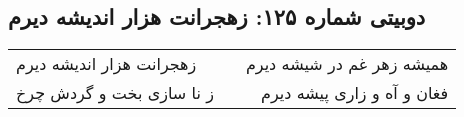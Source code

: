 \begin{center}
\section*{دوبیتی شماره ۱۲۵: زهجرانت هزار اندیشه دیرم}
\label{sec:125}
\begin{longtable}{l p{0.5cm} r}
زهجرانت هزار اندیشه دیرم
&&
همیشه زهر غم در شیشه دیرم
\\
ز نا سازی بخت و گردش چرخ
&&
فغان و آه و زاری پیشه دیرم
\\
\end{longtable}
\end{center}
